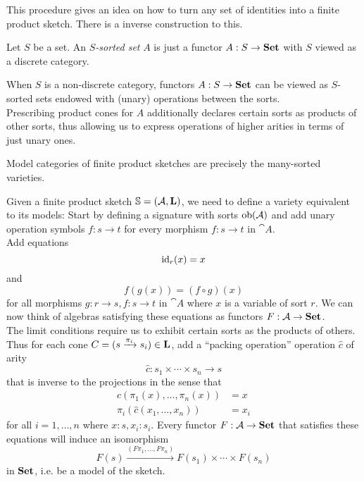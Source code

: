 This procedure gives an idea on how to turn any set of identities into a finite product sketch. There is a inverse construction to this.

\begin{Definition}
Let $S$ be a set. An \emph{$S$-sorted set} $A$ is just a functor $A : S \to \mathbf{Set}$ with $S$ viewed as a discrete category.
\end{Definition}

When $S$ is a non-discrete category, functors $A : S \to \mathbf{Set}$ can be viewed as $S$-sorted sets endowed with (unary) operations between the sorts. \\

Prescribing product cones for $A$ additionally declares certain sorts as products of other sorts, thus allowing us to express operations of higher arities in terms of just unary ones.
 
\begin{Proposition}
Model categories of finite product sketches are precisely the many-sorted varieties.
\end{Proposition}
\begin{Proof}
Given a finite product sketch $\mathbb S = (\mathcal{A}, \textbf{L})$, we need to define a variety equivalent to its models: Start by defining a signature with sorts $\textrm{ob}(\mathcal{A})$ and add unary operation symbols $f : s \to t$ for every morphism $f : s \to t$ in $\cat A$. \\

Add equations
\[ \textrm{id}_r(x) = x \]
and
\[ f(g(x)) = (f \circ g)(x)  \]
for all morphisms $g : r \to s, f : s \to t$ in $\cat A$ where $x$ is a variable of sort $r$. We can now think of algebras satisfying these equations as functors $F : \mathcal{A} \to \mathbf{Set}$. \\

The limit conditions require us to exhibit certain sorts as the products of others. Thus for each cone $C = (s \xrightarrow{\pi_i} s_i) \in \textbf{L}$, add a ``packing operation'' operation $\hat c$ of arity
\[ \hat c : s_1 \times \cdots \times s_n \to s \]
that is inverse to the projections in the sense that
\begin{align*}
\hat c(\pi_1(x), \ldots, \pi_n(x)) &= x \\
\pi_i(\hat c(x_1, \ldots, x_n)) &= x_i
\end{align*}
for all $i=1,\ldots,n$ where $x : s, x_i : s_i$.
Every functor $F : \mathcal{A} \to \mathbf{Set}$ that satisfies these equations will induce an isomorphism
\[ F(s) \xrightarrow{(F\pi_1,\ldots, F\pi_n)} F(s_1) \times \cdots \times F(s_n) \]
in $\mathbf{Set}$, i.e. be a model of the sketch.
\end{Proof}

